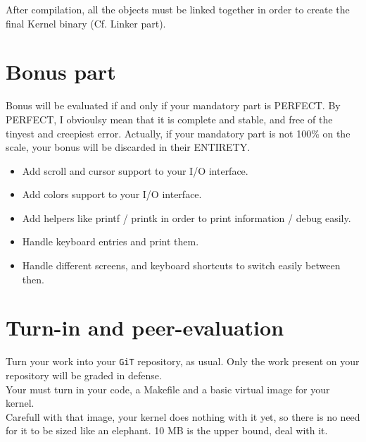\documentclass{42-en}
\begin{document}
		After compilation, all the objects must be linked together in
		order to create	the final Kernel binary (Cf. Linker part).\\

\newpage
\chapter{Bonus part}

    Bonus will be evaluated if and only if your mandatory part is
    PERFECT. By PERFECT, I obvioulsy mean that it is complete and
    stable, and free of the tinyest and creepiest error. Actually, if
    your mandatory part is not 100\% on the scale, your bonus will be
    discarded in their ENTIRETY.

	\begin{itemize}\itemsep1pt
		\item Add scroll and cursor support to your I/O interface.\\
		\item Add colors support to your I/O interface.\\
		\item Add helpers like printf / printk in order to print information /
		debug easily.\\
		\item Handle keyboard entries and print them.\\
		\item Handle different screens, and keyboard shortcuts to switch easily
		between then.\\
	\end{itemize}

\newpage
\chapter{Turn-in and peer-evaluation}


    Turn your work into your \texttt{GiT} repository, as usual.
	Only the work present on your repository will be graded in defense.\\

	Your must turn in your code, a Makefile and a basic virtual image for your kernel.\\
	Carefull with that image, your kernel does nothing with it yet,
    so there is no need for it to be sized like an elephant. 10 MB is
    the upper bound, deal with it.
\end{document}
